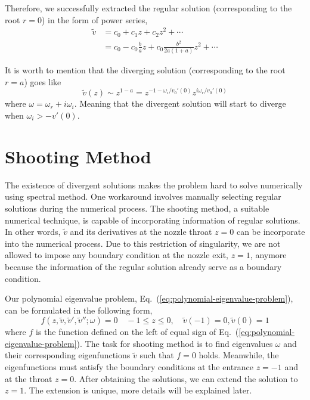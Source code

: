 Therefore, we successfully extracted the regular solution (corresponding to the root $r=0$) in the form of power series,
\begin{equation} \label{eq:regular-solution}
	\begin{aligned}
		\tilde{v} & = c_0 + c_1z + c_2z^2 + \cdots                               \\
		          & = c_0 - c_0\frac{b}{a}z + c_0\frac{b^2}{2a(1+a)}z^2 + \cdots
	\end{aligned}
\end{equation}

It is worth to mention that the diverging solution (corresponding to the root $r=a$) goes like
\begin{equation}
	\tilde{v}(z) \sim z^{1-a} = z^{-1-\omega_i/v_0'(0)}z^{i\omega_r/v_0'(0)}
\end{equation}
where $\omega = \omega_r + i\omega_i$. Meaning that the divergent solution will start to diverge when $\omega_i > -v'(0)$.

\section{Shooting Method}
The existence of divergent solutions makes the problem hard to solve numerically using spectral method. One workaround involves manually selecting regular solutions during the numerical process. The shooting method, a suitable numerical technique, is capable of incorporating information of regular solutions. In other words, $\tilde{v}$ and its derivatives at the nozzle throat $z=0$ can be incorporate into the numerical process. Due to this restriction of singularity, we are not allowed to impose any boundary condition at the nozzle exit, $z=1$, anymore because the information of the regular solution already serve as a boundary condition.

Our polynomial eigenvalue problem, Eq.~(\ref{eq:polynomial-eigenvalue-problem}), can be formulated in the following form,
\begin{equation}
	f(z, \tilde{v}, \tilde{v}', \tilde{v}''; \omega) = 0
	\quad
	-1\leq z \leq 0,
	\quad
	\tilde{v}(-1) = 0, \tilde{v}(0) = 1
\end{equation}
where $f$ is the function defined on the left of equal sign of Eq.~(\ref{eq:polynomial-eigenvalue-problem}). The task for shooting method is to find eigenvalues $\omega$ and their corresponding eigenfunctions $\tilde{v}$ such that $f=0$ holds. Meanwhile, the eigenfunctions must satisfy the boundary conditions at the entrance $z=-1$ and at the throat $z=0$. After obtaining the solutions, we can extend the solution to $z=1$. The extension is unique, more details will be explained later.

